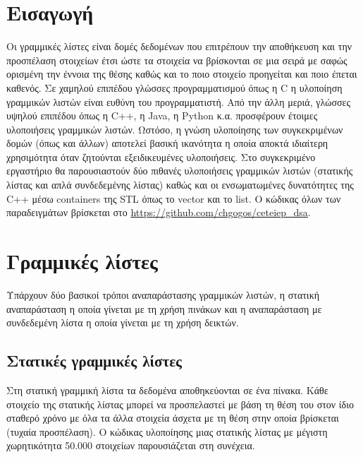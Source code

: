 \section{Εισαγωγή}
Οι γραμμικές λίστες είναι δομές δεδομένων που επιτρέπουν την αποθήκευση και την προσπέλαση στοιχείων έτσι ώστε τα στοιχεία να βρίσκονται σε μια σειρά με σαφώς ορισμένη την έννοια της θέσης καθώς και το ποιο στοιχείο προηγείται και ποιο έπεται καθενός. Σε χαμηλού επιπέδου γλώσσες προγραμματισμού όπως η C η υλοποίηση γραμμικών λιστών είναι ευθύνη του προγραμματιστή. Από την άλλη μεριά, γλώσσες υψηλού επιπέδου όπως η C++, η Java, η Python κ.α. προσφέρουν έτοιμες υλοποιήσεις γραμμικών λιστών. Ωστόσο, η γνώση υλοποίησης των συγκεκριμένων δομών (όπως και άλλων) αποτελεί βασική ικανότητα η οποία αποκτά ιδιαίτερη χρησιμότητα όταν ζητούνται εξειδικευμένες υλοποιήσεις. Στο συγκεκριμένο εργαστήριο θα παρουσιαστούν δύο πιθανές υλοποιήσεις γραμμικών λιστών (στατικής λίστας και απλά συνδεδεμένης λίστας) καθώς και οι ενσωματωμένες δυνατότητες της C++ μέσω containers της STL όπως το vector και το list. Ο κώδικας όλων των παραδειγμάτων βρίσκεται στο \href{https://github.com/chgogos/ceteiep_dsa}{https://github.com/chgogos/ceteiep\_dsa}.

\section{Γραμμικές λίστες}
Υπάρχουν δύο βασικοί τρόποι αναπαράστασης γραμμικών λιστών, η στατική αναπαράσταση η οποία γίνεται με τη χρήση πινάκων και η αναπαράσταση με συνδεδεμένη λίστα η οποία γίνεται με τη χρήση δεικτών. 

\subsection{Στατικές γραμμικές λίστες}
Στη στατική γραμμική λίστα τα δεδομένα αποθηκεύονται σε ένα πίνακα. Κάθε στοιχείο της στατικής λίστας μπορεί να προσπελαστεί με βάση τη θέση του στον ίδιο σταθερό χρόνο με όλα τα άλλα στοιχεία άσχετα με τη θέση στην οποία βρίσκεται (τυχαία προσπέλαση). Ο κώδικας υλοποίησης μιας στατικής λίστας με μέγιστη χωρητικότητα 50.000 στοιχείων παρουσιάζεται στη συνέχεια.





